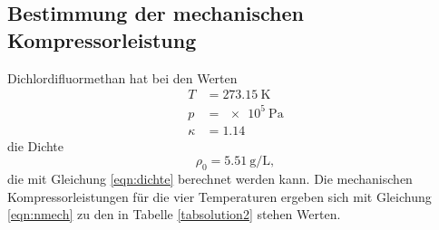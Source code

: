\subsection{Bestimmung der mechanischen Kompressorleistung}
Dichlordifluormethan hat bei den Werten
\begin{align*}
    T &= \SI{273.15}{\kelvin} \\
    p &= \SI{e5}{\pascal} \\
    \kappa &= \num{1.14}
\end{align*}
die Dichte 
\begin{equation*}
    \rho_0 = \SI{5.51}{\gram\per\liter},
\end{equation*}
die mit Gleichung \eqref{eqn:dichte} berechnet werden kann.
Die mechanischen Kompressorleistungen für die vier Temperaturen
ergeben sich mit Gleichung \eqref{eqn:nmech}
zu den in Tabelle \ref{tabsolution2} stehen Werten.
